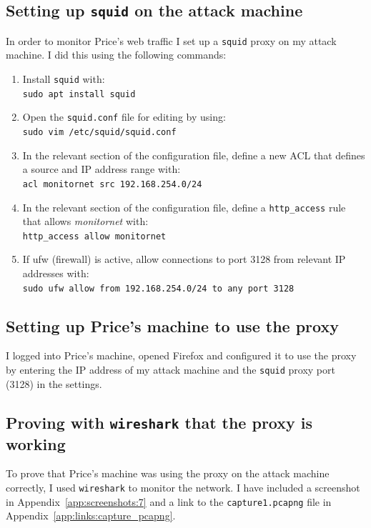 \documentclass[12pt]{report}
\newcommand{\term}[1]{\colorbox{light-gray}{\texttt{#1}}}
\begin{document}
\subsection*{Setting up \texttt{squid} on the attack machine}
In order to monitor Price's web traffic I set up a \texttt{squid} proxy on my attack machine. I did this using the following commands:
\begin{enumerate}
  \item Install \texttt{squid} with:\\
        \term{sudo apt install squid}
  \item Open the \texttt{squid.conf} file for editing by using:\\
        \term{sudo vim /etc/squid/squid.conf}
  \item In the relevant section of the configuration file, define a new ACL that defines a source and IP address range with:\\
        \term{acl monitornet src 192.168.254.0/24}
  \item In the relevant section of the configuration file, define a \texttt{http\_access} rule that allows \textit{monitornet} with:\\
        \term{http\_access allow monitornet}
  \item If ufw (firewall) is active, allow connections to port 3128 from relevant IP addresses with:\\
        \term{sudo ufw allow from 192.168.254.0/24 to any port 3128}
\end{enumerate}

\subsection*{Setting up Price's machine to use the proxy}
I logged into Price's machine, opened Firefox and configured it to use the proxy by entering the IP address of my attack machine and the \texttt{squid} proxy port (3128) in the settings.


\subsection*{Proving with \texttt{wireshark} that the proxy is working}
To prove that Price's machine was using the proxy on the attack machine correctly, I used \texttt{wireshark} to monitor the network. I have included a screenshot in Appendix~\ref{app:screenshots:7} and a link to the \texttt{capture1.pcapng} file in Appendix~\ref{app:links:capture_pcapng}.
\end{document}
